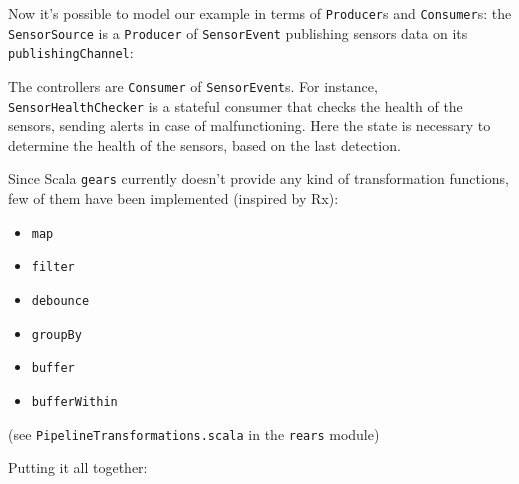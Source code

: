\documentclass[aspectratio=1610,xcolor=dvipsnames]{beamer}
\begin{document}
%
\begin{frame}
  
\end{frame}
%
\begin{frame}
  \small
  Now it's possible to model our example in terms of \texttt{Producer}s and \texttt{Consumer}s: the \texttt{SensorSource} is a \texttt{Producer} of \texttt{SensorEvent} publishing sensors data on its \texttt{publishingChannel}:
  
\end{frame}
%
\begin{frame}
  \small
  The controllers are \texttt{Consumer} of \texttt{SensorEvent}s. For instance, 
  \texttt{SensorHealthChecker} is a stateful consumer that checks the health of the sensors, sending alerts in case of malfunctioning. Here the state is necessary to determine the health of the sensors, based on the last detection.
  
\end{frame}
%
\begin{frame}
  
\end{frame}
%
\begin{frame}
  Since Scala \texttt{gears} currently doesn't provide any kind of transformation functions, few of them have been implemented (inspired by Rx):
  \begin{itemize}
      \item \texttt{map}
      \item \texttt{filter}
      \item \texttt{debounce}
      \item \texttt{groupBy}
      \item \texttt{buffer}
      \item \texttt{bufferWithin}
  \end{itemize}
  \footnotesize
  (see \texttt{PipelineTransformations.scala} in the \texttt{rears} module)
\end{frame}
%
\begin{frame}
  \small
  Putting it all together:
  
\end{frame}
%
\end{document}
